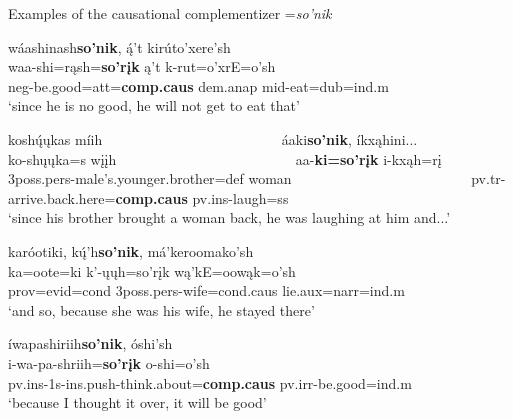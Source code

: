 \newpage
\begin{exe}

\item\label{soPnikexamples} Examples of the causational complementizer =\textit{so'nik}

	\begin{xlist}
	
	\item\label{soPnikexamples1}
	\glll wáashinash\textbf{so'nik}, ą́'t kirúto'xere'sh\\
	waa-shi=rąsh=\textbf{so'rįk} ą't k-rut=o'xrE=o'sh\\
	neg-\textnormal{be.good}=att=\textbf{comp.caus} dem.anap mid-\textnormal{eat}=dub=ind.m\\
	\glt `since he is no good, he will not get to eat that' \citep[43]{hollow1973a}

	\item\label{soPnikexamples2}
	\glll koshų́ųkas míih ~ ~ ~ ~ ~ ~ ~ ~ ~ ~ ~ ~ ~ ~ ~  áaki\textbf{so'nik}, íkxąhini...\\
	ko-shųųka=s wįįh ~ ~ ~ ~ ~ ~ ~ ~ ~ ~ ~ ~ ~ ~ ~  aa-\textbf{ki=so'rįk} i-kxąh=rį\\
	3poss.pers-\textnormal{male's.younger.brother}=def \textnormal{woman} ~ ~ ~ ~ ~ ~ ~ ~ ~ ~ ~ ~ ~ ~ ~ pv.tr-\textnormal{arrive.back.here}=\textbf{comp.caus} pv.ins-\textnormal{laugh}=ss\\
	\glt `since his brother brought a woman back, he was laughing at him and...' \citep[73]{hollow1973a}

	\item\label{soPnikexamples3}
	\glll karóotiki, kų́'h\textbf{so'nik}, má'keroomako'sh\\
	ka=oote=ki k'-ųųh=so'rįk wą'kE=oowąk=o'sh\\
	prov=evid=cond 3poss.pers-\textnormal{wife}=cond.caus \textnormal{lie}.aux=narr=ind.m\\
	\glt `and so, because she was his wife, he stayed there' \citep[28]{hollow1973b}

	\item\label{soPnikexamples4}
	\glll íwapashiriih\textbf{so'nik}, óshi'sh\\
	i-wa-pa-shriih=\textbf{so'rįk} o-shi=o'sh\\
	pv.ins-1s-ins.push-\textnormal{think.about}=\textbf{comp.caus} pv.irr-\textnormal{be.good}=ind.m\\
	\glt `because I thought it over, it will be good' \citep[210]{hollow1973b}

	\end{xlist}

\end{exe}

